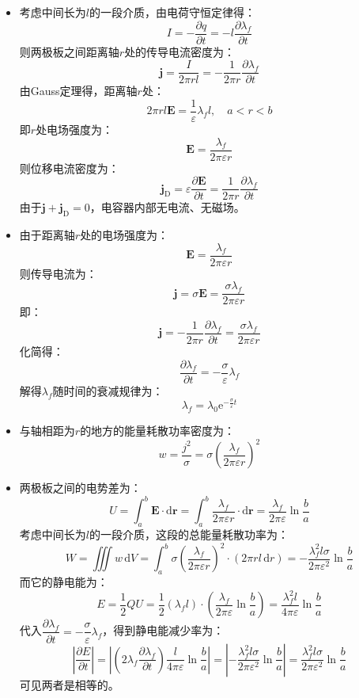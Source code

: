 \documentclass[a4paper,fontset=none]{ctexart}
\begin{document}
\begin{itemize}
        \item[14.(1)]
        考虑中间长为$l$的一段介质，由电荷守恒定律得：
        \[
            I = -\frac{\partial q}{\partial t} = -l\frac{\partial \lambda_f}{\partial t}
        \]
        则两极板之间距离轴$r$处的传导电流密度为：
        \[
            \bm{j} = \frac{I}{2\pi rl} = -\frac{1}{2\pi r}\frac{\partial \lambda_f}{\partial t}
        \]
        由Gauss定理得，距离轴$r$处：
        \[
            2\pi rl\bm{E} = \frac{1}{\varepsilon}\lambda_f l,\quad a<r<b
        \]
        即$r$处电场强度为：
        \[
            \bm{E} = \frac{\lambda_f}{2\pi\varepsilon r}
        \]
        则位移电流密度为：
        \[
            \bm{j}_{\mathrm{D}} = \varepsilon\frac{\partial\bm{E}}{\partial t}= \frac{1}{2\pi r}\frac{\partial \lambda_f}{\partial t}
        \]
        由于$\bm{j}+\bm{j}_{\mathrm{D}}=0$，电容器内部无电流、无磁场。

        \item[14.(2)]
        由于距离轴$r$处的电场强度为：
        \[
            \bm{E} = \frac{\lambda_f}{2\pi\varepsilon r}
        \]
        则传导电流为：
        \[
            \bm{j} = \sigma\bm{E} = \frac{\sigma\lambda_f}{2\pi\varepsilon r}
        \]
        即：
        \[
            \bm{j} = -\frac{1}{2\pi r}\frac{\partial \lambda_f}{\partial t} = \frac{\sigma\lambda_f}{2\pi\varepsilon r}
        \]
        化简得：
        \[
            \frac{\partial \lambda_f}{\partial t} = -\frac{\sigma}{\varepsilon}\lambda_f
        \]
        解得$\lambda_f$随时间的衰减规律为：
        \[
            \lambda_f = \lambda_0\mathrm{e}^{-\tfrac{\sigma}{\varepsilon}t}
        \]

        \item[14.(3)]
        与轴相距为$r$的地方的能量耗散功率密度为：
        \[
            w = \frac{j^2}{\sigma} = \sigma\left(\frac{\lambda_f}{2\pi\varepsilon r}\right)^2
        \]

        \item[14.(4)]
        两极板之间的电势差为：
        \[
            U = \int_a^b \bm{E}\cdot\mathrm{d}\bm{r} = \int_a^b \frac{\lambda_f}{2\pi\varepsilon r}\cdot\mathrm{d}\bm{r} = \frac{\lambda_f}{2\pi\varepsilon}\ln\frac{b}{a}
        \]
        考虑中间长为$l$的一段介质，这段的总能量耗散功率为：
        \[
            W = \iiint w\,\mathrm{d}V = \int_a^b \sigma\left(\frac{\lambda_f}{2\pi\varepsilon r}\right)^2 \cdot (2\pi rl\,\mathrm{d}r) = -\frac{\lambda_f^2 l\sigma}{2\pi\varepsilon^2}\ln\frac{b}{a}
        \]
        而它的静电能为：
        \[
            E = \frac{1}{2}QU = \frac{1}{2}(\lambda_f l) \cdot \left(\frac{\lambda_f}{2\pi\varepsilon}\ln\frac{b}{a}\right) = \frac{\lambda_f^2 l}{4\pi\varepsilon}\ln\frac{b}{a}
        \]
        代入$\dfrac{\partial \lambda_f}{\partial t}=-\dfrac{\sigma}{\varepsilon}\lambda_f$，得到静电能减少率为：
        \[
            \left|\frac{\partial E}{\partial t}\right| = \left|\left(2\lambda_f\frac{\partial\lambda_f}{\partial t}\right)\frac{l}{4\pi\varepsilon}\ln\frac{b}{a}\right| = \left|-\frac{\lambda_f^2 l\sigma}{2\pi\varepsilon^2}\ln\frac{b}{a}\right| = \frac{\lambda_f^2 l\sigma}{2\pi\varepsilon^2}\ln\frac{b}{a}
        \]
        可见两者是相等的。

    \end{itemize}
\end{document}
